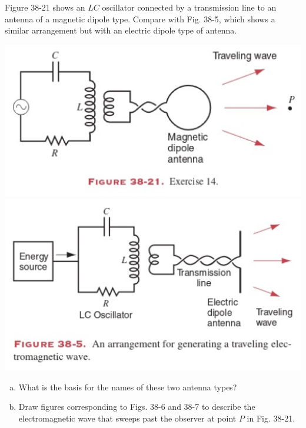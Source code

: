 \documentclass[12pt,letterpaper]{hmcpset}
\begin{document}
	\begin{problem}[38E14:]
		Figure 38-21 shows an $LC$ oscillator connected by a transmission line to an antenna of a magnetic dipole type.
		Compare with Fig. 38-5, which shows a similar arrangement but with an electric dipole type of antenna.
		
		\begin{center}
			\includegraphics[scale = 0.3]{Fig_38-21} \includegraphics[scale = 0.3]{Fig_38-5}
		\end{center}

		\begin{enumerate}[(a)]
			\item What is the basis for the names of these two antenna types?
			\item Draw figures corresponding to Figs. 38-6 and 38-7 to describe the electromagnetic wave that sweeps past the observer at point $P$ in Fig. 38-21.


\end{enumerate}
\end{problem}
\end{document}
